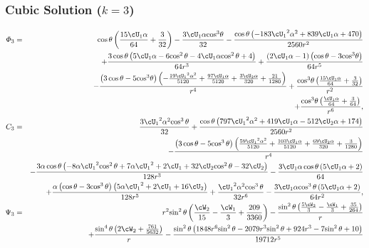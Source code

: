 \subsubsection{Cubic Solution ($k = 3$)}

\begin{eqnarray*}
\varPhi_3 &=& \cos\theta \left(\frac{15 \cU_1\alpha}{64} + \frac{3}{32}\right) - \frac{3 \cU_1\alpha {\cos}^3\theta}{32} - \frac{\cos\theta \left( - 183 {\cU_1}^2\alpha^2 + 839 \cU_1\alpha + 470\right)}{2560 r^2} \\ 
&&+ \frac{3 \cos\theta \left(5 \cU_1\alpha - 6 {\cos^2\theta} - 4 \cU_1\alpha {\cos^2\theta} + 4\right)}{64 r^3} + \frac{\left(2 \cU_1\alpha - 1\right) \left(\cos\theta - 3 {\cos}^3\theta\right)}{64 r^5} 
\\ 
&&- \frac{\left(3 \cos\theta - 5 {\cos}^3\theta\right) \left( - \frac{19 {\cU_1}^2\alpha^2}{5120} + \frac{97 \cU_1\alpha}{5120} + \frac{3 \cU_2\alpha}{320} + \frac{21}{1280}\right)}{r^4} + \frac{{\cos}^3\theta \left(\frac{15 \cU_1\alpha}{64} + \frac{3}{32}\right)}{r^2} \\ 
&&+ \frac{{\cos}^3\theta \left(\frac{\cU_1\alpha}{64} + \frac{3}{64}\right)}{r^6},
\\
C_3 &=&
\frac{3 {{\cU_1}}^2\alpha^2 {\cos^3\theta}}{32} + \frac{\cos\theta \left(797 {{\cU_1}}^2\alpha^2 + 419 {\cU_1}\alpha - 512 {\cU_2}\alpha + 174\right)}{2560 r^2} \\
&&- \frac{\left(3 \cos\theta - 5 {\cos^3\theta}\right) \left(\frac{59 {{\cU_1}}^2\alpha^2}{5120} + \frac{103 {\cU_1}\alpha}{5120} + \frac{69 {\cU_2}\alpha}{320} + \frac{3}{1280}\right)}{r^4} \\
&&- \frac{3\alpha \cos\theta \left( - 8\alpha {{\cU_1}}^2 {\cos^2\theta} + 7\alpha {{\cU_1}}^2 + 2 {\cU_1} + 32 {\cU_2} {\cos^2\theta} - 32 {\cU_2}\right)}{128 r^3} - \frac{3 {\cU_1}\alpha \cos\theta \left(5 {\cU_1}\alpha + 2\right)}{64} \\
&&+ \frac{\alpha \left(\cos\theta - 3 {\cos^3\theta}\right) \left(5\alpha {{\cU_1}}^2 + 2 {\cU_1} + 16 {\cU_2}\right)}{128 r^5} + \frac{{{\cU_1}}^2\alpha^2 {\cos^3\theta}}{32 r^6} - \frac{3 {\cU_1}\alpha {\cos^3\theta} \left(5 {\cU_1}\alpha + 2\right)}{64 r^2},
\\
\Psi_3 &=&
r^2 {\sin^2\theta} \left(\frac{{\cW_2}}{15} - \frac{{\cW_1}}{3} + \frac{209}{3360}\right) 
 - \frac{{\sin^2\theta} \left(\frac{5 {\cW_2}}{3} - \frac{{\cW_1}}{3} + \frac{35}{264}\right)}{r}
\\ && + \frac{{\sin^4\theta} \left(2 {\cW_2} + \frac{761}{5632}\right)}{r} - \frac{{\sin^2\theta} \left(1848 r^6 {\sin^2\theta} - 2079 r^3 {\sin^2\theta} + 924 r^3 - 7 {\sin^2\theta} + 10\right)}{19712 r^5} 

\end{eqnarray*}
